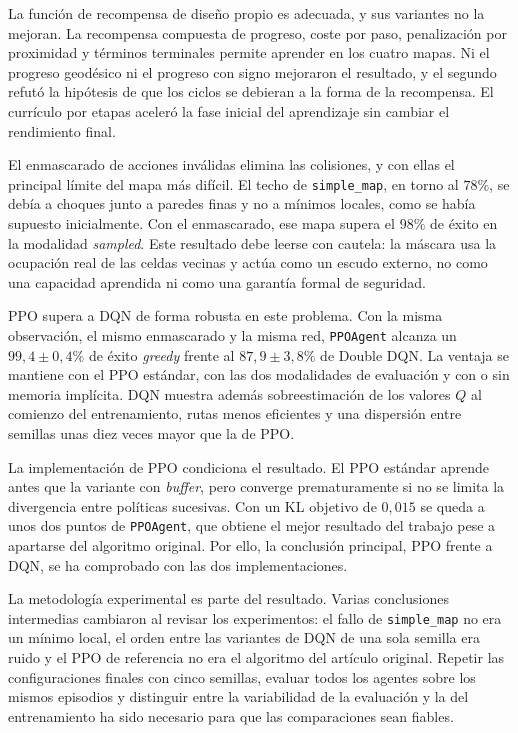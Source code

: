 La función de recompensa de diseño propio es adecuada, y sus variantes no
la mejoran. La recompensa compuesta de progreso, coste por paso,
penalización por proximidad y términos terminales permite aprender en
los cuatro mapas. Ni el progreso geodésico ni el progreso con signo
mejoraron el resultado, y el segundo refutó la hipótesis de que los
ciclos se debieran a la forma de la recompensa. El currículo por etapas
aceleró la fase inicial del aprendizaje sin cambiar el rendimiento final.

El enmascarado de acciones inválidas elimina las colisiones, y con ellas
el principal límite del mapa más difícil. El techo de
\texttt{simple\_map}, en torno al $78\%$, se debía a choques junto a
paredes finas y no a mínimos locales, como se había supuesto
inicialmente. Con el enmascarado, ese mapa supera el $98\%$ de éxito en
la modalidad \textit{sampled}. Este resultado debe leerse con cautela: la
máscara usa la ocupación real de las celdas vecinas y actúa como un
escudo externo, no como una capacidad aprendida ni como una garantía
formal de seguridad.

PPO supera a DQN de forma robusta en este problema. Con la misma
observación, el mismo enmascarado y la misma red, \texttt{PPOAgent}
alcanza un $99{,}4 \pm 0{,}4\%$ de éxito \textit{greedy} frente al
$87{,}9 \pm 3{,}8\%$ de Double DQN. La ventaja se mantiene con el PPO
estándar, con las dos modalidades de evaluación y con o sin memoria
implícita. DQN muestra además sobreestimación de los valores $Q$ al
comienzo del entrenamiento, rutas menos eficientes y una dispersión entre
semillas unas diez veces mayor que la de PPO.

La implementación de PPO condiciona el resultado. El PPO
estándar aprende antes que la variante con \textit{buffer}, pero converge
prematuramente si no se limita la divergencia entre políticas sucesivas.
Con un KL objetivo de $0{,}015$ se queda a unos dos puntos de
\texttt{PPOAgent}, que obtiene el mejor resultado del trabajo pese a
apartarse del algoritmo original. Por ello, la conclusión principal, PPO
frente a DQN, se ha comprobado con las dos implementaciones.

La metodología experimental es parte del resultado. Varias
conclusiones intermedias cambiaron al revisar los experimentos: el fallo
de \texttt{simple\_map} no era un mínimo local, el orden entre las
variantes de DQN de una sola semilla era ruido y el PPO de referencia no
era el algoritmo del artículo original. Repetir las configuraciones
finales con cinco semillas, evaluar todos los agentes sobre los mismos
episodios y distinguir entre la variabilidad de la evaluación y la del
entrenamiento ha sido necesario para que las comparaciones sean fiables.

